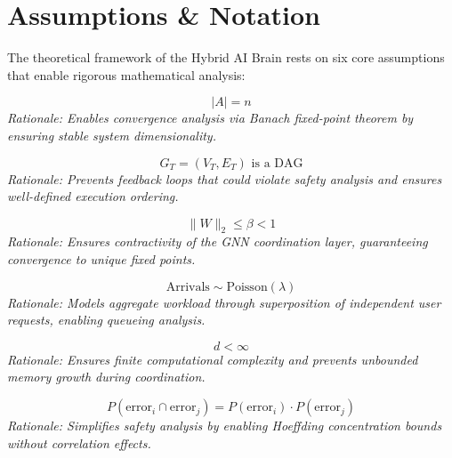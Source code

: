 \documentclass{article}
\begin{document}
\appendix

\section{Assumptions \& Notation}
\label{app:assumptions}

The theoretical framework of the Hybrid AI Brain rests on six core assumptions that enable rigorous mathematical analysis:

\begin{tcolorbox}[colback=blue!5!white,colframe=blue!75!black,title=\textbf{A1: Fixed Agent Population}]
$$|A| = n$$
\textit{Rationale: Enables convergence analysis via Banach fixed-point theorem by ensuring stable system dimensionality.}
\end{tcolorbox}

\begin{tcolorbox}[colback=blue!5!white,colframe=blue!75!black,title=\textbf{A2: Acyclic Task Execution Graphs}]
$$G_T = (V_T, E_T) \text{ is a DAG}$$
\textit{Rationale: Prevents feedback loops that could violate safety analysis and ensures well-defined execution ordering.}
\end{tcolorbox}

\begin{tcolorbox}[colback=blue!5!white,colframe=blue!75!black,title=\textbf{A3: Weight-Constrained Networks}]
$$\|W\|_2 \leq \beta < 1$$
\textit{Rationale: Ensures contractivity of the GNN coordination layer, guaranteeing convergence to unique fixed points.}
\end{tcolorbox}

\begin{tcolorbox}[colback=blue!5!white,colframe=blue!75!black,title=\textbf{A4: Poisson Task Arrivals}]
$$\text{Arrivals} \sim \text{Poisson}(\lambda)$$
\textit{Rationale: Models aggregate workload through superposition of independent user requests, enabling queueing analysis.}
\end{tcolorbox}

\begin{tcolorbox}[colback=blue!5!white,colframe=blue!75!black,title=\textbf{A5: Bounded Message Dimensions}]
$$d < \infty$$
\textit{Rationale: Ensures finite computational complexity and prevents unbounded memory growth during coordination.}
\end{tcolorbox}

\begin{tcolorbox}[colback=blue!5!white,colframe=blue!75!black,title=\textbf{A6: Independent Edge Masking Errors}]
$$P(\text{error}_i \cap \text{error}_j) = P(\text{error}_i) \cdot P(\text{error}_j)$$
\textit{Rationale: Simplifies safety analysis by enabling Hoeffding concentration bounds without correlation effects.}
\end{tcolorbox}
\end{document}
